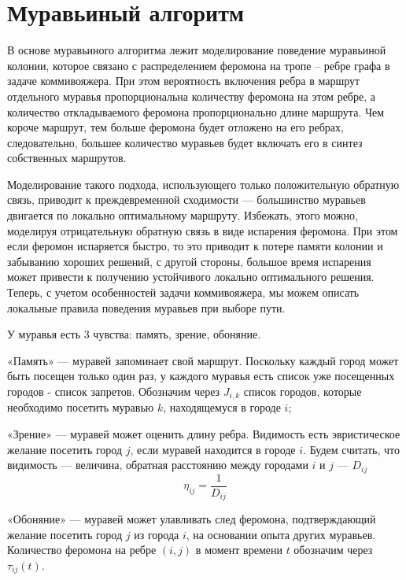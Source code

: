 \section{Муравьиный алгоритм}

В основе муравьиного алгоритма лежит моделирование поведение муравьиной колонии, которое связано с распределением феромона на тропе -- ребре графа в задаче коммивояжера. При этом вероятность включения ребра в маршрут отдельного муравья пропорциональна количеству феромона на этом ребре, а количество откладываемого феромона пропорционально длине маршрута. Чем короче маршрут, тем больше феромона будет отложено на его ребрах, следовательно, большее количество муравьев будет включать его в синтез собственных маршрутов.


Моделирование такого подхода, использующего только положительную обратную связь, приводит к преждевременной сходимости — большинство муравьев двигается по локально оптимальному маршруту. Избежать, этого можно, моделируя отрицательную обратную связь в виде испарения феромона. При этом если феромон испаряется быстро, то это приводит к потере памяти колонии и забыванию хороших решений, с другой стороны, большое время испарения может привести к получению устойчивого локально оптимального решения. Теперь, с учетом особенностей задачи коммивояжера, мы можем описать локальные правила поведения муравьев при выборе пути.


У муравья есть 3 чувства: память, зрение, обоняние.


«Память» --- муравей запоминает свой маршрут. Поскольку каждый город может быть посещен только один раз, у каждого муравья есть список уже посещенных городов - список запретов. Обозначим через $J_{i,k}$ список городов, которые необходимо посетить муравью $k$, находящемуся в городе $i$;


«Зрение» --- муравей может оценить длину ребра. Видимость есть эвристическое желание посетить город $j$, если муравей находится в городе $i$. Будем считать, что видимость — величина, обратная расстоянию между городами $i$ и $j$ --- $D_{ij}$ 
	\begin{equation}
		\label{eq:vision}
		\eta_{ij} = \frac{1}{D_{ij}}
	\end{equation}


«Обоняние» --- муравей может улавливать след феромона, подтверждающий желание посетить город $j$ из города $i$, на основании опыта других муравьев. Количество феромона на ребре $(i,j)$ в момент времени $t$ обозначим через $\tau_{ij}(t)$.

